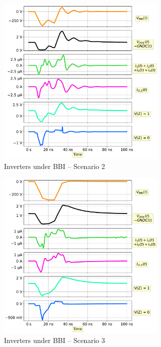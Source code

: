 \documentclass[10pt, conference, compsocconf]{IEEEtran}
\begin{document}
\begin{figure}[!hbtp]
\centering
\includegraphics[width=3.2in]{logic_gates_tri_M1}
\caption{Inverters under BBI – Scenario 2}
\label{simIvxM1}
\end{figure}

\begin{figure}[!hbtp]
\centering
\includegraphics[width=3.2in]{logic_gates_tri_M2}
\caption{Inverters under BBI – Scenario 3}
\label{simIvxM2}
\end{figure}
\end{document}

